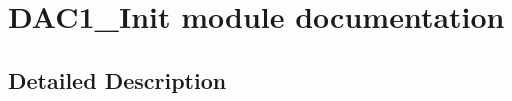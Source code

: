 \hypertarget{group___d_a_c1___init__module}{}\section{D\+A\+C1\+\_\+\+Init module documentation}
\label{group___d_a_c1___init__module}


\subsection{Detailed Description}
